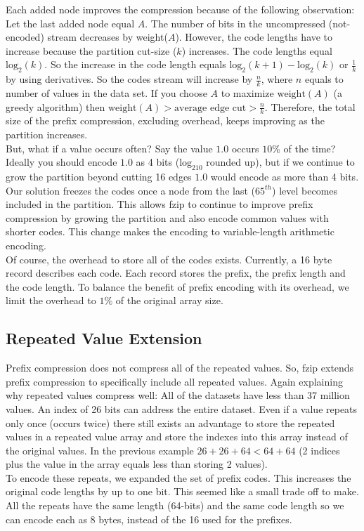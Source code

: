 Each added node improves the compression because of the following observation: Let the last added node equal $A$. The number of bits in the uncompressed (not-encoded) stream decreases by weight($A$). However, the code lengths have to increase because the partition cut-size ($k$) increases. The code lengths equal $\textrm{log}_2(k)$. So the increase in the code length equals $\textrm{log}_2(k+1)-\textrm{log}_2(k)$ or $\frac{1}{k}$ by using derivatives. So the codes stream will increase by $\frac{n}{k}$, where $n$ equals to number of values in the data set. If you choose $A$ to maximize $\textrm{weight}(A)$ (a greedy algorithm) then $\textrm{weight}(A) > \textrm{average edge cut} > \frac{n}{k}$. Therefore, the total size of the prefix compression, excluding overhead, keeps improving as the partition increases.\\
\indent But, what if a value occurs often? Say the value $1.0$ occurs $10\%$ of the time? Ideally you should encode $1.0$ as 4 bits ($\textrm{log}_210$ rounded up), but if we continue to grow the partition beyond cutting 16 edges $1.0$ would encode as more than 4 bits. Our solution freezes the codes once a node from the last ($65^{th}$) level becomes included in the partition. This allows fzip to continue to improve prefix compression by growing the partition and also encode common values with shorter codes. This change makes the encoding to variable-length arithmetic encoding.\\
\indent Of course, the overhead to store all of the codes exists. Currently, a 16 byte record describes each code. Each record stores the prefix, the prefix length and the code length. To balance the benefit of prefix encoding with its overhead, we limit the overhead to $1\%$ of the original array size.
\subsection{Repeated Value Extension}
Prefix compression does not compress all of the repeated values. So, fzip extends prefix compression to specifically include all repeated values. Again explaining why repeated values compress well: All of the datasets have less than 37 million values. An index of 26 bits can address the entire dataset. Even if a value repeats only once (occurs twice) there still exists an advantage to store the repeated values in a repeated value array and store the indexes into this array instead of the original values. In the previous example $26+26+64<64+64$ (2 indices plus the value in the array equals less than storing 2 values).\\
\indent To encode these repeats, we expanded the set of prefix codes. This increases the original code lengths by up to one bit. This seemed like a small trade off to make. All the repeats have the same length (64-bits) and the same code length so we can encode each as 8 bytes, instead of the 16 used for the prefixes.

